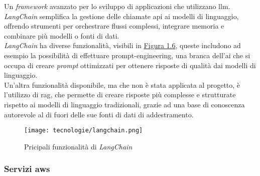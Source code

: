 Un \textit{framework} avanzato per lo sviluppo di applicazioni che utilizzano \gls{llm}. 
\textit{LangChain} semplifica la gestione delle chiamate \gls{api} ai modelli di linguaggio, offrendo strumenti per orchestrare flussi complessi, integrare memoria e combinare più modelli o fonti di dati.\\
\textit{LangChain} ha diverse funzionalità, visibili in {\hyperref[fig:langchain-usecases]{Figura 1.6}}, queste includono ad esempio la possibilità di effettuare \gls{prompt-engineering}, una branca dell'\gls{ai} che si occupa di creare \textit{prompt} ottimizzati per ottenere risposte di qualità dai modelli di linguaggio.\\
Un'altra funzionalità disponibile, ma che non è stata applicata al progetto, è l'utilizzo di \gls{rag}, che permette di creare risposte più complesse e strutturate rispetto ai modelli di linguaggio tradizionali,
grazie ad una base di conoscenza autorevole al di fuori delle sue fonti di dati di addestramento.\\
\begin{figure}[H]
    \label{fig:langchain-usecases}
    \centering
    \texttt{[image: tecnologie/langchain.png]}
    \caption{Pricipali funzionalità di \textit{LangChain}}
\end{figure}

\subsubsection{Servizi \gls{aws}}

